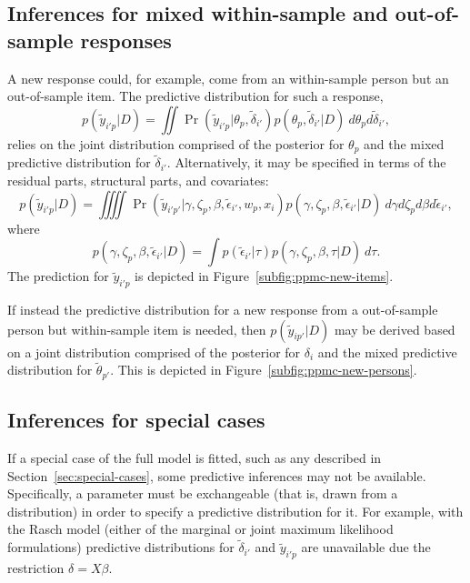 \documentclass[12pt, letterpaper]{article}
\begin{document}
\subsection{Inferences for mixed within-sample and out-of-sample responses}

A new response could, for example, come from an within-sample person but an out-of-sample item. The predictive distribution for such a response,
\begin{equation}
	p(\tilde y_{i'p} | D) = 
	\iint
		\Pr (\tilde y_{i'p} | \theta_{p}, \tilde \delta_{i'})
		p(\theta_{p}, \tilde \delta_{i'} | D)
	~d \theta_{p} d \tilde \delta_{i'}
,\end{equation}
relies on the joint distribution comprised of the posterior for $\theta_{p}$ and the mixed predictive distribution for $\tilde \delta_{i'}$.
Alternatively, it may be specified in terms of the residual parts, structural parts, and covariates:
\begin{equation}
	p(\tilde y_{i'p} | D) =
	\iiiint
		\Pr (\tilde y_{i'p'} | \gamma,\zeta_{p}, \beta, \tilde \epsilon_{i'}, 
			w_p, x_i)
		p(\gamma, \zeta_{p}, \beta, \tilde \epsilon_{i'} | D)
	~d\gamma d \zeta_{p} d \beta d \tilde \epsilon_{i'}
,\end{equation}
where
\begin{equation}
	p(\gamma, \zeta_{p}, \beta, \tilde \epsilon_{i'} | D) = 
	\int
		p(\tilde \epsilon_{i'} | \tau)
		p(\gamma, \zeta_p, \beta, \tau | D)
	~d \tau
.\end{equation}
The prediction for $\tilde y_{i'p}$ is depicted in Figure~\ref{subfig:ppmc-new-items}. 

If instead the predictive distribution for a new response from a out-of-sample person but within-sample item is needed, then $p(\tilde y_{ip'} | D)$ may be derived based on a joint distribution comprised of the posterior for $\delta_{i}$ and the mixed predictive distribution for $\tilde \theta_{p'}$. This is depicted in Figure~\ref{subfig:ppmc-new-persons}.


\subsection{Inferences for special cases}

If a special case of the full model is fitted, such as any described in Section~\ref{sec:special-cases}, some predictive inferences may not be available. Specifically, a parameter must be exchangeable (that is, drawn from a distribution) in order to specify a predictive distribution for it. For example, with the Rasch model (either of the marginal or joint maximum likelihood formulations) predictive distributions for $\tilde \delta_{i'}$ and $\tilde y_{i'p}$ are unavailable due the restriction $\delta = X \beta$. 
\end{document}
